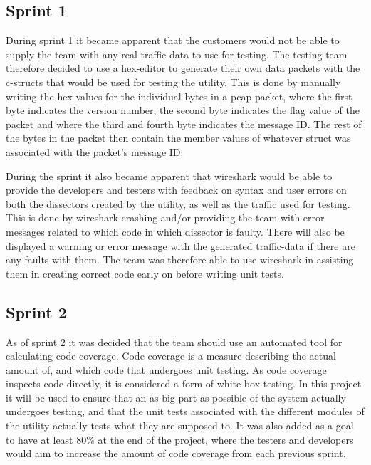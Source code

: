 \subsection{Sprint 1}
During sprint 1 it became apparent that the customers would not be able to supply the team with any real traffic data to use for testing. The testing team therefore decided to use a hex-editor to generate their own data \glspl{packet} with the \Gls{c}-\glspl{struct} that would be used for testing the \gls{utility}. This is done by manually writing the hex values for the individual bytes in a pcap \gls{packet}, where the first byte indicates the version number, the second byte indicates the flag value of the \gls{packet} and where the third and fourth byte indicates the message ID. The rest of the bytes in the \gls{packet} then contain the \gls{member} values of whatever \gls{struct} was associated with the \gls{packet}'s message ID.

During the sprint it also became apparent that \Gls{wireshark} would be able to provide the developers and testers with feedback on syntax and user errors on both the \glspl{dissector} created by the \gls{utility}, as well as the traffic used for testing. This is done by \Gls{wireshark} crashing and/or providing the team with error messages related to which code in which \gls{dissector} is faulty. There will also be displayed a warning or error message with the generated traffic-data if there are any faults with them. The team was therefore able to use \Gls{wireshark} in assisting them in creating correct code early on before writing unit tests.   

\subsection{Sprint 2}
As of sprint 2 it was decided that the team should use an automated tool for calculating code coverage. Code coverage is a measure describing the actual amount of, and which code that undergoes unit testing. As code coverage inspects code directly, it is considered a form of white box testing. In this project it will be used to ensure that an as big part as possible of the system actually undergoes testing, and that the unit tests associated with the different modules of the \gls{utility} actually tests what they are supposed to. It was also added as a goal to have at least 80\% at the end of the project, where the testers and developers would aim to increase the amount of code coverage from each previous sprint.

